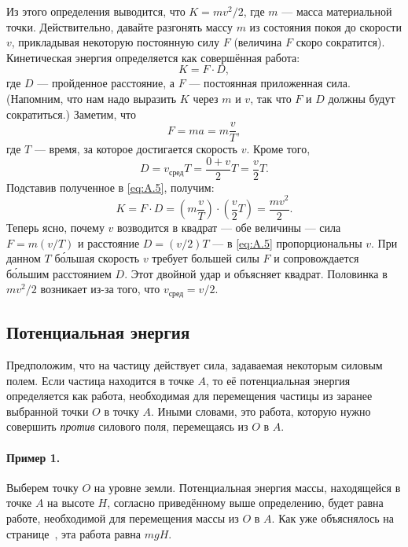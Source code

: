 Из этого определения выводится, что $K=m v^2/2$, где $m$ --- масса материальной точки.
Действительно, давайте разгонять массу $m$ из состояния покоя до скорости $v$, прикладывая некоторую постоянную силу $F$ (величина $F$ скоро сократится).
Кинетическая энергия определяется как совершённая работа:
\begin{equation}
K=F \cdot D,
\label{eq:A.5}
\end{equation}
где $D$ --- пройденное расстояние, а $F$ --- постоянная приложенная сила.
(Напомним, что нам надо выразить $K$ через $m$ и $v$,
так что $F$ и $D$ должны будут сократиться.)
Заметим, что
\[F=ma=m \frac{v}{T},\]
где $T$ --- время, за которое достигается скорость $v$.
Кроме того,
\[D=v_{\text{сред}} T=\frac{0+v}2  T=\frac{v}2 T.\]
Подставив полученное в \eqref{eq:A.5}, получим:
\[K=F \cdot D= \left(m \frac{v}{T}\right) \cdot\left(\frac{v}2 T\right)= \frac{m v^2}2 .\]
Теперь ясно, почему $v$ возводится в квадрат --- обе величины --- сила $F=m(v/T)$ и расстояние $D=(v/2)T$ --- в \eqref{eq:A.5} пропорциональны $v$.
При данном $T$ б\'{о}льшая скорость $v$ требует большей силы $F$ и сопровождается б\'{о}льшим расстоянием $D$.
Этот двойной удар и объясняет квадрат.
Половинка в $mv^2/2$ возникает из-за того, что $v_{\text{сред}}=v/2$.

\subsection{Потенциальная энергия}

Предположим, что на частицу действует сила, задаваемая некоторым силовым полем.
Если частица находится в точке $A$, то её потенциальная энергия определяется как работа, необходимая для перемещения частицы из заранее выбранной точки $O$ в точку $A$.
Иными словами, это работа, которую нужно совершить \emph{против} силового поля, перемещаясь из $O$ в $A$.

\paragraph{Пример 1.}
Выберем точку $O$ на уровне земли.
Потенциальная энергия массы, находящейся в точке $A$ на высоте $H$,
согласно приведённому выше определению, будет равна работе,
необходимой для перемещения массы из $O$ в $A$.
Как уже объяснялось на странице~\pageref{Работа:Пример}, эта работа равна $mgH$.

